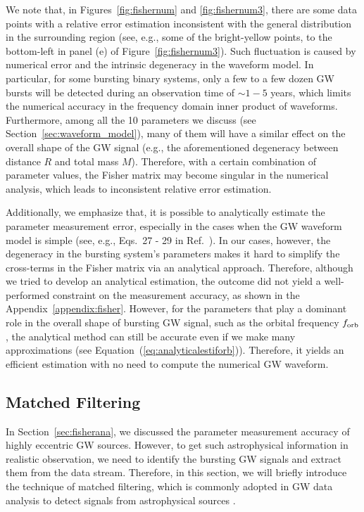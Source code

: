 \documentclass[%
 reprint,
 amsmath,amssymb,
 aps,
]{revtex4-2}
\begin{document}
We note that, in Figures~\ref{fig:fishernum} and \ref{fig:fishernum3}, there are some data points with a relative error estimation inconsistent with the general distribution in the surrounding region (see, e.g., some of the bright-yellow points, to the bottom-left in panel (e) of Figure~\ref{fig:fishernum3}). Such fluctuation is caused by numerical error and the intrinsic degeneracy in the waveform model. In particular, for some bursting binary systems, only a few to a few dozen GW bursts will be detected during an observation time of $\sim 1-5$ years, which limits the numerical accuracy in the frequency domain inner product of waveforms. Furthermore, among all the 10 parameters we discuss (see Section~\ref{sec:waveform_model}), many of them will have a similar effect on the overall shape of the GW signal (e.g., the aforementioned degeneracy between distance $R$ and total mass $M$). Therefore, with a certain combination of parameter values, the Fisher matrix may become singular in the numerical analysis, which leads to inconsistent relative error estimation.


Additionally, we emphasize that, it is possible to analytically estimate the parameter measurement error, especially in the cases when the GW waveform model is simple (see, e.g., Eqs.~27 - 29 in Ref.~\citep{Seto02WD}). In our cases, however, the degeneracy in the bursting system's parameters makes it hard to simplify the cross-terms in the Fisher matrix via an analytical approach. Therefore, although we tried to develop an analytical estimation, the outcome did not yield a well-performed constraint on the measurement accuracy, as shown in the Appendix~\ref{appendix:fisher}. However, for the parameters that play a dominant role in the overall shape of bursting GW signal, such as the orbital frequency $f_{\rm orb}$, the analytical method can still be accurate even if we make many approximations (see Equation~(\ref{eq:analyticalestiforb})). Therefore, it yields an efficient estimation with no need to compute the numerical GW waveform.

\subsection{Matched Filtering}\label{sec:MFmethod}
In Section~\ref{sec:fisherana}, we discussed the parameter measurement accuracy of highly eccentric GW sources. However, to get such astrophysical information in realistic observation, we need to identify the bursting GW signals and extract them from the data stream. Therefore, in this section, we will briefly introduce the technique of matched filtering, which is commonly adopted in GW data analysis to detect signals from astrophysical sources \citep[see, e.g., ][for more details]{Cutler+94, Allen2011,Petigura2013MF,LIGO2021SoftX..1300658A,LIGO2023tutorial}.
\end{document}
